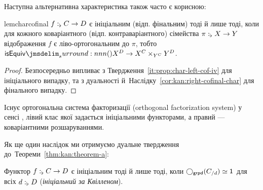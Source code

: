 \documentclass[12pt]{article}
\newcommand{\Equiv}{\mathrel{\simeq}}
\newcommand{\GM}{\flat}
\let\prn\DelimPrn
\begin{document}
Наступна альтернативна характеристика також часто є корисною:

\begin{restatable}{lem}{charcofinal}
  \label{prop:kan:charcofinal}
  $\DeclVar{f}{\GM}{C \to D}$ є ініціальним \textup(відп. фінальним\textup) тоді й лише тоді, коли для кожного коваріантного \textup(відп. контраваріантного\textup) сімейства $\DeclVar{\pi}{\GM}{X \to Y}$ відображення $f$ є ліво-ортогональним до $\pi$, тобто $\IsEquiv\prn{X^D \to X^C \times_{Y^C} Y^D}$.
\end{restatable}
\begin{proof}
  Безпосередньо випливає з Твердження~\ref{it:prop:char-left-cof-iv} для ініціального випадку, та з дуальності й~Наслідку~\ref{cor:kan:right-cofinal-char} для фінального випадку.
\end{proof}

\begin{cor}
  \label{cor:initial-covariant-ofs}
  Існує ортогональна система факторизації (orthogonal factorization system) у сенсі \cite{rijke:2020}, лівий клас якої задається ініціальними функторами, а правий --- коваріантними розшаруваннями.
\end{cor}

Як ще один наслідок ми отримуємо дуальне твердження до~Теореми~\ref{thm:kan:theorem-a}:
\begin{cor}
  \label{thm:kan:theorem-a-dual}
  Функтор $\DeclVar{f}{\GM}{C \to D}$ є ініціальним тоді й лише тоді, коли $\Grpdify(\SLICE{C}{d}) \Equiv \Unit$ для всіх $\DeclVar{d}{\GM}{D}$ \textup(\emph{ініціальний за Квілленом}\textup).
\end{cor}
\end{document}

